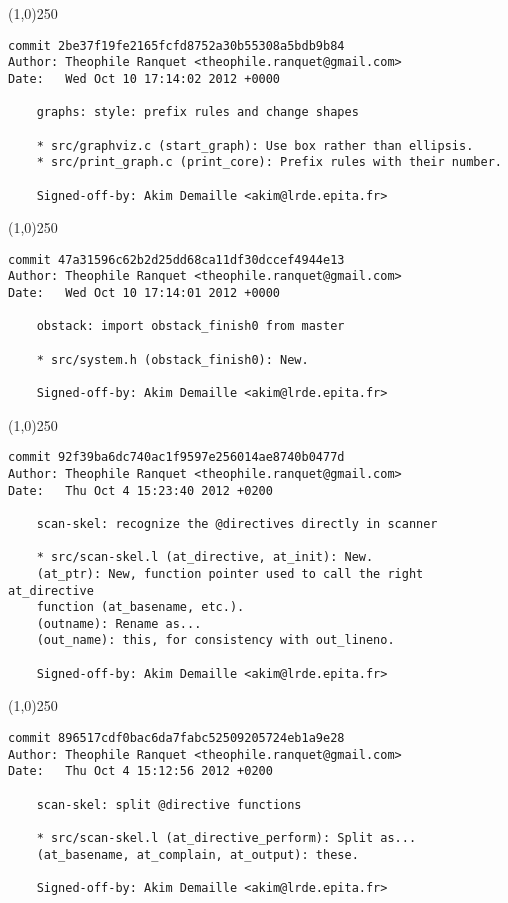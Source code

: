 \line(1,0){250}
\begin{verbatim}
commit 2be37f19fe2165fcfd8752a30b55308a5bdb9b84
Author: Theophile Ranquet <theophile.ranquet@gmail.com>
Date:   Wed Oct 10 17:14:02 2012 +0000

    graphs: style: prefix rules and change shapes
    
    * src/graphviz.c (start_graph): Use box rather than ellipsis.
    * src/print_graph.c (print_core): Prefix rules with their number.
    
    Signed-off-by: Akim Demaille <akim@lrde.epita.fr>

\end{verbatim}
\line(1,0){250}
\begin{verbatim}
commit 47a31596c62b2d25dd68ca11df30dccef4944e13
Author: Theophile Ranquet <theophile.ranquet@gmail.com>
Date:   Wed Oct 10 17:14:01 2012 +0000

    obstack: import obstack_finish0 from master
    
    * src/system.h (obstack_finish0): New.
    
    Signed-off-by: Akim Demaille <akim@lrde.epita.fr>

\end{verbatim}
\line(1,0){250}
\begin{verbatim}
commit 92f39ba6dc740ac1f9597e256014ae8740b0477d
Author: Theophile Ranquet <theophile.ranquet@gmail.com>
Date:   Thu Oct 4 15:23:40 2012 +0200

    scan-skel: recognize the @directives directly in scanner
    
    * src/scan-skel.l (at_directive, at_init): New.
    (at_ptr): New, function pointer used to call the right at_directive
    function (at_basename, etc.).
    (outname): Rename as...
    (out_name): this, for consistency with out_lineno.
    
    Signed-off-by: Akim Demaille <akim@lrde.epita.fr>

\end{verbatim}
\line(1,0){250}
\begin{verbatim}
commit 896517cdf0bac6da7fabc52509205724eb1a9e28
Author: Theophile Ranquet <theophile.ranquet@gmail.com>
Date:   Thu Oct 4 15:12:56 2012 +0200

    scan-skel: split @directive functions
    
    * src/scan-skel.l (at_directive_perform): Split as...
    (at_basename, at_complain, at_output): these.
    
    Signed-off-by: Akim Demaille <akim@lrde.epita.fr>

\end{verbatim}

